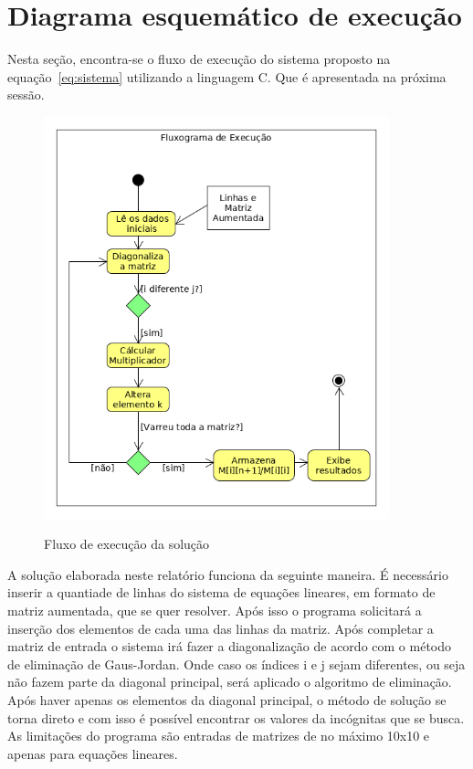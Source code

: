 \documentclass[12pt, hidelinks]{article}
\begin{document}
\newpage
\section{Diagrama esquemático de execução}

Nesta seção, encontra-se o fluxo de execução do sistema proposto na equação~\eqref{eq:sistema} utilizando
a linguagem C. Que é apresentada na próxima sessão.

\begin{figure}[!h]
  \centering
  \includegraphics[width=10cm]{figuras/fluxograma.png}\\
  \caption{Fluxo de execução da solução}\label{fig:fluxo}
\end{figure}

A solução elaborada neste relatório funciona da seguinte maneira. É necessário inserir a quantiade de linhas
do sistema de equações lineares, em formato de matriz aumentada, que se quer resolver. Após isso o programa
solicitará a inserção dos elementos de cada uma das linhas da matriz. Após completar a matriz de entrada o
sistema irá fazer a diagonalização de acordo com o método de eliminação de Gaus-Jordan. Onde caso os índices
i e j sejam diferentes, ou seja não fazem parte da diagonal principal, será aplicado o algoritmo de eliminação.
Após haver apenas os elementos da diagonal principal, o método de solução se torna direto e com isso é possível
encontrar os valores da incógnitas que se busca. As limitações do programa são entradas de matrizes de no máximo
10x10 e apenas para equações lineares.
\end{document}
